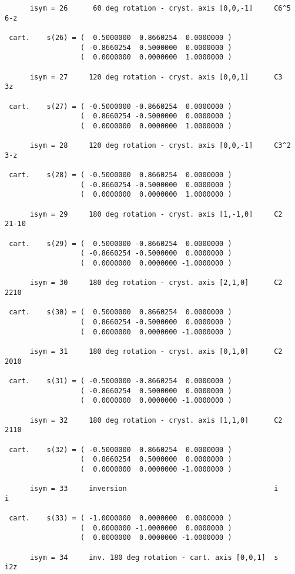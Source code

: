 \documentclass[12pt,a4paper,twoside]{report}
\begin{document}
\begin{tcolorbox}
\begin{scriptsize}
\begin{verbatim}
      isym = 26      60 deg rotation - cryst. axis [0,0,-1]     C6^5   6-z

 cart.    s(26) = (  0.5000000  0.8660254  0.0000000 )
                  ( -0.8660254  0.5000000  0.0000000 )
                  (  0.0000000  0.0000000  1.0000000 )

      isym = 27     120 deg rotation - cryst. axis [0,0,1]      C3     3z

 cart.    s(27) = ( -0.5000000 -0.8660254  0.0000000 )
                  (  0.8660254 -0.5000000  0.0000000 )
                  (  0.0000000  0.0000000  1.0000000 )

      isym = 28     120 deg rotation - cryst. axis [0,0,-1]     C3^2   3-z

 cart.    s(28) = ( -0.5000000  0.8660254  0.0000000 )
                  ( -0.8660254 -0.5000000  0.0000000 )
                  (  0.0000000  0.0000000  1.0000000 )

      isym = 29     180 deg rotation - cryst. axis [1,-1,0]     C2     21-10

 cart.    s(29) = (  0.5000000 -0.8660254  0.0000000 )
                  ( -0.8660254 -0.5000000  0.0000000 )
                  (  0.0000000  0.0000000 -1.0000000 )

      isym = 30     180 deg rotation - cryst. axis [2,1,0]      C2     2210

 cart.    s(30) = (  0.5000000  0.8660254  0.0000000 )
                  (  0.8660254 -0.5000000  0.0000000 )
                  (  0.0000000  0.0000000 -1.0000000 )

      isym = 31     180 deg rotation - cryst. axis [0,1,0]      C2     2010

 cart.    s(31) = ( -0.5000000 -0.8660254  0.0000000 )
                  ( -0.8660254  0.5000000  0.0000000 )
                  (  0.0000000  0.0000000 -1.0000000 )

      isym = 32     180 deg rotation - cryst. axis [1,1,0]      C2     2110

 cart.    s(32) = ( -0.5000000  0.8660254  0.0000000 )
                  (  0.8660254  0.5000000  0.0000000 )
                  (  0.0000000  0.0000000 -1.0000000 )

      isym = 33     inversion                                   i      i

 cart.    s(33) = ( -1.0000000  0.0000000  0.0000000 )
                  (  0.0000000 -1.0000000  0.0000000 )
                  (  0.0000000  0.0000000 -1.0000000 )

      isym = 34     inv. 180 deg rotation - cart. axis [0,0,1]  s      i2z


\end{verbatim}
\end{scriptsize}
\end{tcolorbox}
\end{document}
